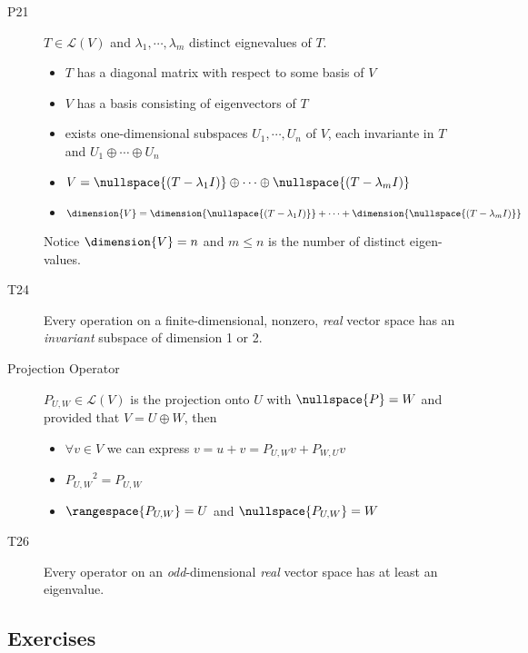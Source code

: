 \begin{description}
\item[P21\label{itm:P5_21}] $T\in\mathcal{L}(V)$ and $\lambda_1,\cdots,\lambda_m$ distinct eignevalues of $T$.
\begin{itemize}
\item $T$ has a diagonal matrix with respect to some basis of $V$
\item $V$ has a basis consisting of eigenvectors of $T$
\item exists one-dimensional subspaces $U_1,\cdots,U_n$ of $V$, each invariante in $T$ and $U_1\oplus\cdots\oplus U_n$
\item $V=\nullspace{(T-\lambda_1I)}\oplus\cdots \oplus\nullspace{(T-\lambda_mI)}$
\item $\dimension{V}=\dimension{\nullspace{(T-\lambda_1I)}}+\cdots+ \dimension{\nullspace{(T-\lambda_mI)}}$
\end{itemize}
Notice $\dimension{V}=n$ and $m\leq n$ is the number of distinct eigen-values.

\item[T24] Every operation on a finite-dimensional, nonzero, \emph{real} vector space has an \emph{invariant} subspace of dimension 1 or 2.

\item[Projection Operator\label{itm:D5_projection_operator}] $P_{U,W}\in\mathcal{L}(V)$ is the projection onto $U$ with $\nullspace{P} = W$ and provided that $V=U\oplus W$, then
\begin{itemize}
\item $\forall v\in V$ we can express $v=u+v=P_{U,W}v+P_{W,U}v$
\item ${P_{U,W}}^2 = P_{U,W}$
\item $\rangespace{P_{U,W}}=U$ and $\nullspace{P_{U,W}}=W$
\end{itemize}

\item[T26] Every operator on an \emph{odd}-dimensional \emph{real} vector space has at least an eigenvalue.

\end{description}

\subsection*{Exercises}
\setcounter{paragraph}{0}

